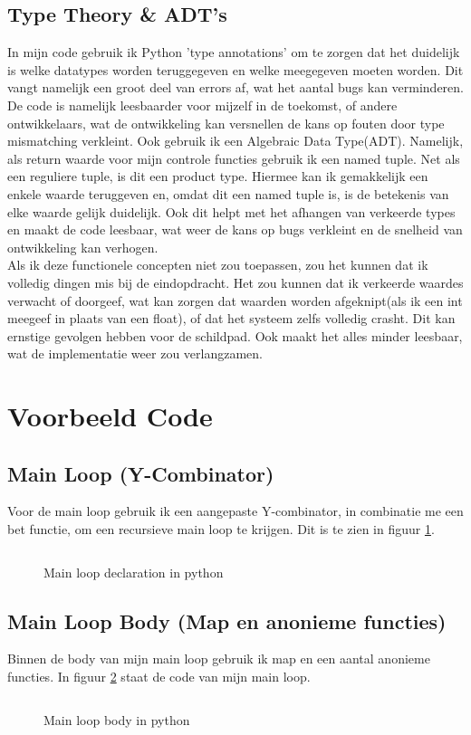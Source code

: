 \documentclass[a4paper]{report}
\begin{document}
\subsection{Type Theory \& ADT's}
In mijn code gebruik ik Python 'type annotations' om te zorgen dat het duidelijk is welke datatypes worden teruggegeven en welke meegegeven moeten worden.
Dit vangt namelijk een groot deel van errors af, wat het aantal bugs kan verminderen. De code is namelijk leesbaarder voor mijzelf in de toekomst, of andere ontwikkelaars, wat de ontwikkeling kan versnellen de kans op fouten door type mismatching verkleint.
Ook gebruik ik een Algebraic Data Type(ADT). Namelijk, als return waarde voor mijn controle functies gebruik ik een named tuple.
Net als een reguliere tuple, is dit een product type\cite{enwiki:1171248602}. Hiermee kan ik gemakkelijk een enkele waarde teruggeven en, omdat dit een named tuple is, is de betekenis van elke waarde gelijk duidelijk.
Ook dit helpt met het afhangen van verkeerde types en maakt de code leesbaar, wat weer de kans op bugs verkleint en de snelheid van ontwikkeling kan verhogen.
\\
Als ik deze functionele concepten niet zou toepassen, zou het kunnen dat ik volledig dingen mis bij de eindopdracht. Het zou kunnen dat ik verkeerde waardes verwacht of doorgeef, wat kan zorgen dat waarden worden afgeknipt(als ik een int meegeef in plaats van een float), of dat het systeem zelfs volledig crasht.
Dit kan ernstige gevolgen hebben voor de schildpad. Ook maakt het alles minder leesbaar, wat de implementatie weer zou verlangzamen.
\pagebreak
\section{Voorbeeld Code}
\label{sec:example-code}
\subsection{Main Loop (Y-Combinator)}
Voor de main loop gebruik ik een aangepaste Y-combinator, in combinatie me een bet functie, om een recursieve main loop te krijgen.
Dit is te zien in figuur \ref{fig:ml_dec}.
\begin{figure}[H]
  \inputminted[firstline=1,bgcolor=bg,linenos, breaklines]{Python}{Appendices/example_ml.py}
  \caption{Main loop declaration in python}
  \label{fig:ml_dec}
\end{figure}
\pagebreak
\subsection{Main Loop Body (Map en anonieme functies)}
Binnen de body van mijn main loop gebruik ik map en een aantal anonieme functies. 
In figuur \ref{fig:ml_body} staat de code van mijn main loop.
\begin{figure}[H]
  \inputminted[firstline=29, lastline=44,bgcolor=bg,linenos, breaklines]{Python}{../Code/main.py}
  \caption{Main loop body in python}
  \label{fig:ml_body}
\end{figure}
\pagebreak
\end{document}
